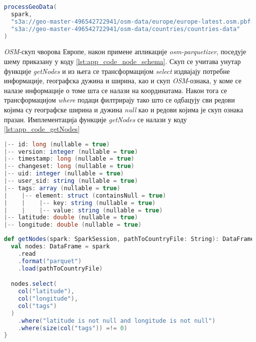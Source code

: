 \documentclass[12pt,oneside]{memoir}
\begin{document}
\begin{lstlisting}[caption={Позивање функције која започиње обраду података}, language=Scala, label={lst:app_code_main_processGeoData}]
processGeoData(
  spark,
  "s3a://geo-master-496542722941/osm-data/europe/europe-latest.osm.pbf.node.parquet",
  "s3a://geo-master-496542722941/osm-data/countries/countries-data"
)
\end{lstlisting}

\textit{OSM}-скуп чворова Европе, након примене апликације \textit{osm-parquetizer}, поседује шему приказану у коду \ref{lst:app_code_node_schema}. Скуп се учитава унутар функције \textit{getNodes} и из њега се трансформацијом \textit{select} издвајају потребне информације, географска дужина и ширина, као и скуп \textit{OSM}-ознака, у коме се налазе информације о томе шта се налази на координатама. Након тога се трансформацијом \textit{where} подаци филтрирају тако што се одбацују сви редови којима су географске ширина и дужина \textit{null} као и редови којима је скуп ознака празан. Имплементација функције \textit{getNodes} се налази у коду \ref{lst:app_code_getNodes}

\begin{lstlisting}[caption={Шема \textit{OSM}-скупа чворова након примене апликације \textit{osm-parquetizer}}, language=Scala, label={lst:app_code_node_schema}]
|-- id: long (nullable = true)
|-- version: integer (nullable = true)
|-- timestamp: long (nullable = true)
|-- changeset: long (nullable = true)
|-- uid: integer (nullable = true)
|-- user_sid: string (nullable = true)
|-- tags: array (nullable = true)
|    |-- element: struct (containsNull = true)
|    |    |-- key: string (nullable = true)
|    |    |-- value: string (nullable = true)
|-- latitude: double (nullable = true)
|-- longitude: double (nullable = true)
\end{lstlisting}

\begin{lstlisting}[caption={Функција која учитава податке и извршава иницијално филтрирање колона и редова}, language=Scala, label={lst:app_code_getNodes}]
def getNodes(spark: SparkSession, pathToCountryFile: String): DataFrame = {
  val nodes: DataFrame = spark
    .read
    .format("parquet")
    .load(pathToCountryFile)

  nodes.select(
    col("latitude"),
    col("longitude"),
    col("tags")
  )
    .where("latitude is not null and longitude is not null")
    .where(size(col("tags")) =!= 0)
}
\end{lstlisting}
\end{document}
